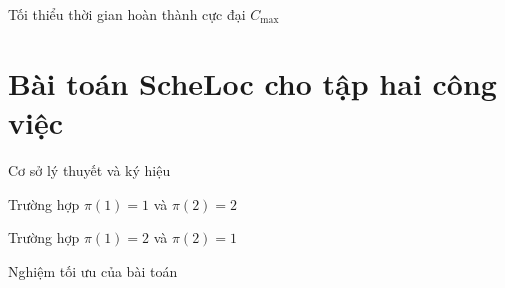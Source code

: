 \documentclass[10pt]{beamer}
\begin{document}
\begin{frame}{Tối thiểu thời gian hoàn thành cực đại $C_{\max}$}
\end{frame}

\section{Bài toán ScheLoc cho tập hai công việc}

\begin{frame}{Cơ sở lý thuyết và ký hiệu}
\end{frame}

\begin{frame}{Trường hợp $\pi(1)=1$ và  $\pi(2) = 2$}
\end{frame}

\begin{frame}{Trường hợp $\pi(1)=2$ và  $\pi(2) = 1$}
\end{frame}

\begin{frame}{Nghiệm tối ưu của bài toán}
\end{frame}

\begin{frame}
\end{frame}

\begin{frame}
    \nocite{*}
    \printbibliography
\end{frame}


\begin{frame}
    \begin{block}{}
    \medskip
    \center{\huge \it \textcolor[rgb]{0.37, 0.150, 0.190}{Thanks for listening!}}
    \medskip
    \end{block}	
\end{frame}    
\end{document}
